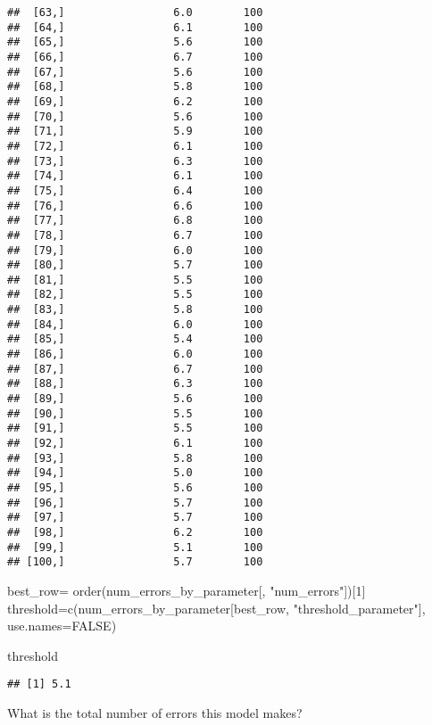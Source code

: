 \documentclass[
]{article}
\newenvironment{Shaded}{\begin{snugshade}}{\end{snugshade}}
\newcommand{\AttributeTok}[1]{\textcolor[rgb]{0.77,0.63,0.00}{#1}}
\newcommand{\ConstantTok}[1]{\textcolor[rgb]{0.00,0.00,0.00}{#1}}
\newcommand{\DecValTok}[1]{\textcolor[rgb]{0.00,0.00,0.81}{#1}}
\newcommand{\FunctionTok}[1]{\textcolor[rgb]{0.00,0.00,0.00}{#1}}
\newcommand{\NormalTok}[1]{#1}
\newcommand{\OtherTok}[1]{\textcolor[rgb]{0.56,0.35,0.01}{#1}}
\newcommand{\StringTok}[1]{\textcolor[rgb]{0.31,0.60,0.02}{#1}}
\begin{document}
\begin{verbatim}
##  [63,]                 6.0        100
##  [64,]                 6.1        100
##  [65,]                 5.6        100
##  [66,]                 6.7        100
##  [67,]                 5.6        100
##  [68,]                 5.8        100
##  [69,]                 6.2        100
##  [70,]                 5.6        100
##  [71,]                 5.9        100
##  [72,]                 6.1        100
##  [73,]                 6.3        100
##  [74,]                 6.1        100
##  [75,]                 6.4        100
##  [76,]                 6.6        100
##  [77,]                 6.8        100
##  [78,]                 6.7        100
##  [79,]                 6.0        100
##  [80,]                 5.7        100
##  [81,]                 5.5        100
##  [82,]                 5.5        100
##  [83,]                 5.8        100
##  [84,]                 6.0        100
##  [85,]                 5.4        100
##  [86,]                 6.0        100
##  [87,]                 6.7        100
##  [88,]                 6.3        100
##  [89,]                 5.6        100
##  [90,]                 5.5        100
##  [91,]                 5.5        100
##  [92,]                 6.1        100
##  [93,]                 5.8        100
##  [94,]                 5.0        100
##  [95,]                 5.6        100
##  [96,]                 5.7        100
##  [97,]                 5.7        100
##  [98,]                 6.2        100
##  [99,]                 5.1        100
## [100,]                 5.7        100
\end{verbatim}

\begin{Shaded}
\begin{Highlighting}[]
\NormalTok{best\_row}\OtherTok{=} \FunctionTok{order}\NormalTok{(num\_errors\_by\_parameter[, }\StringTok{"num\_errors"}\NormalTok{])[}\DecValTok{1}\NormalTok{]}
\NormalTok{threshold}\OtherTok{=}\FunctionTok{c}\NormalTok{(num\_errors\_by\_parameter[best\_row, }\StringTok{"threshold\_parameter"}\NormalTok{], }\AttributeTok{use.names=}\ConstantTok{FALSE}\NormalTok{)}

\NormalTok{threshold}
\end{Highlighting}
\end{Shaded}

\begin{verbatim}
## [1] 5.1
\end{verbatim}

What is the total number of errors this model makes?
\end{document}
